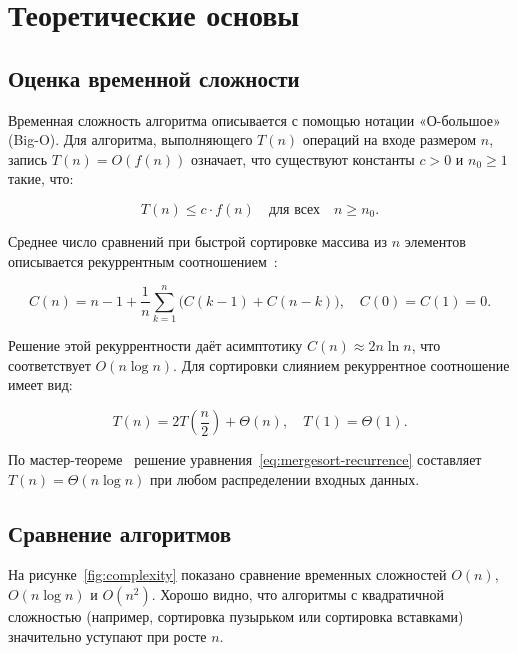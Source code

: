 \section{Теоретические основы}

\subsection{Оценка временной сложности}

Временная сложность алгоритма описывается с помощью нотации «О-большое» (Big-O). Для
алгоритма, выполняющего $T(n)$ операций на входе размером $n$, запись
$T(n) = O(f(n))$ означает, что существуют константы $c > 0$ и $n_0 \geq 1$ такие, что:

\begin{equation}
    \label{eq:big-o}
    T(n) \leq c \cdot f(n) \quad \text{для всех} \quad n \geq n_0.
\end{equation}

Среднее число сравнений при быстрой сортировке массива из $n$ элементов описывается
рекуррентным соотношением~\cite{cormen2009algorithms}:

\begin{equation}
    \label{eq:quicksort-recurrence}
    C(n) = n - 1 + \frac{1}{n} \sum_{k=1}^{n} \bigl(C(k-1) + C(n-k)\bigr),
    \quad C(0) = C(1) = 0.
\end{equation}

Решение этой рекуррентности даёт асимптотику $C(n) \approx 2n\ln n$, что соответствует
$O(n \log n)$. Для сортировки слиянием рекуррентное соотношение имеет вид:

\begin{equation}
    \label{eq:mergesort-recurrence}
    T(n) = 2T\!\left(\frac{n}{2}\right) + \Theta(n), \quad T(1) = \Theta(1).
\end{equation}

По мастер-теореме~\cite{cormen2009algorithms} решение уравнения~\eqref{eq:mergesort-recurrence}
составляет $T(n) = \Theta(n \log n)$ при любом распределении входных данных.

\subsection{Сравнение алгоритмов}

На рисунке~\ref{fig:complexity} показано сравнение временных сложностей $O(n)$,
$O(n \log n)$ и $O(n^2)$. Хорошо видно, что алгоритмы с квадратичной сложностью
(например, сортировка пузырьком или сортировка вставками) значительно уступают при
росте $n$.

